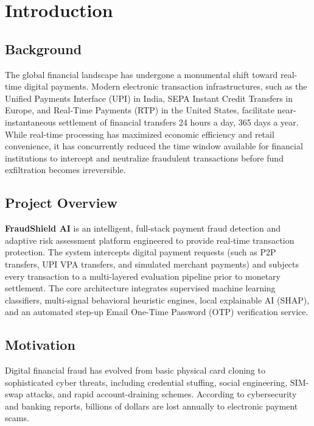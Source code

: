 \chapter{Introduction}
\label{chap:introduction}

\section{Background}
The global financial landscape has undergone a monumental shift toward real-time digital payments. Modern electronic transaction infrastructures, such as the Unified Payments Interface (UPI) in India, SEPA Instant Credit Transfers in Europe, and Real-Time Payments (RTP) in the United States, facilitate near-instantaneous settlement of financial transfers 24 hours a day, 365 days a year. While real-time processing has maximized economic efficiency and retail convenience, it has concurrently reduced the time window available for financial institutions to intercept and neutralize fraudulent transactions before fund exfiltration becomes irreversible.

\section{Project Overview}
\textbf{FraudShield AI} is an intelligent, full-stack payment fraud detection and adaptive risk assessment platform engineered to provide real-time transaction protection. The system intercepts digital payment requests (such as P2P transfers, UPI VPA transfers, and simulated merchant payments) and subjects every transaction to a multi-layered evaluation pipeline prior to monetary settlement. The core architecture integrates supervised machine learning classifiers, multi-signal behavioral heuristic engines, local explainable AI (SHAP), and an automated step-up Email One-Time Password (OTP) verification service.

\section{Motivation}
Digital financial fraud has evolved from basic physical card cloning to sophisticated cyber threats, including credential stuffing, social engineering, SIM-swap attacks, and rapid account-draining schemes. According to cybersecurity and banking reports, billions of dollars are lost annually to electronic payment scams. 

